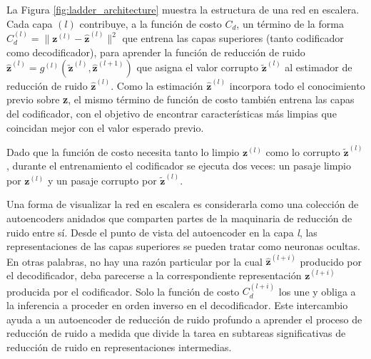 La Figura \ref{fig:ladder_architecture} muestra la estructura de una red en escalera. Cada capa $(l)$ contribuye, a la función de costo $C_{d}$, un término de la forma $C_{d}^{(l)} = \| \textbf{z}^{(l)} - \hat{\textbf{z}}^{(l)}\|^2$ que entrena las capas superiores (tanto codificador como decodificador), para aprender la función de reducción de ruido $\hat{\textbf{z}}^{(l)} = g^{(l)}(\tilde{\textbf{z}}^{(l)},\hat{\textbf{z}}^{(l+1)})$ que asigna el valor corrupto $\tilde{\textbf{z}}^{(l)}$ al estimador de reducción de ruido $\hat{\textbf{z}}^{(l)}$. Como la estimación $\hat{\textbf{z}}^{(l)}$ incorpora todo el conocimiento previo sobre \textbf{z}, el mismo término de función de costo también entrena las capas del codificador, con el objetivo de encontrar características más limpias que coincidan mejor con el valor esperado previo.

Dado que la función de costo necesita tanto lo limpio $\textbf{z}^{(l)}$ como lo corrupto $\tilde{\textbf{z}}^{(l)}$, durante el entrenamiento el codificador se ejecuta dos veces: un pasaje limpio por $\textbf{z}^{(l)}$ y un pasaje corrupto por $\tilde{\textbf{z}}^{(l)}$.

Una forma de visualizar la red en escalera es considerarla como una colección de autoencoders anidados que comparten partes de la maquinaria de reducción de ruido entre sí. Desde el punto de vista del autoencoder en la capa \textit{l}, las representaciones de las capas superiores se pueden tratar como neuronas ocultas. En otras palabras, no hay una razón particular por la cual $\hat{\textbf{z}}^{(l+i)}$ producido por el decodificador, deba parecerse a la correspondiente representación $\textbf{z}^{(l+i)}$ producida por el codificador. Solo la función de costo $C_{d}^{(l+i)}$ los une y obliga a la inferencia a proceder en orden inverso en el decodificador. Este intercambio ayuda a un autoencoder de reducción de ruido profundo a aprender el proceso de reducción de ruido a medida que divide la tarea en subtareas significativas de reducción de ruido en representaciones intermedias.